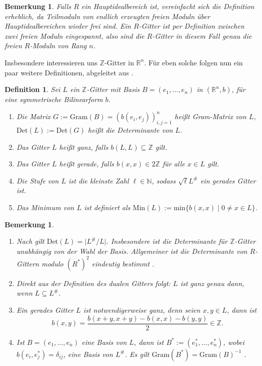 \documentclass[12pt,a4paper,halfparskip,headsepline,bibtotocnumbered]{scrreprt}
\theoremstyle{nummermitklammern}
\newtheorem{definition}[defsatzusw]{Definition}
\newtheorem{bemerkung}[defsatzusw]{Bemerkung}
\theoremstyle{nonumberbreak}
\newcommand{\N}{\mathbb{N}}
\newcommand{\Z}{\mathbb{Z}}
\newcommand{\R}{\mathbb{R}}
\newcommand{\Det}{\text{Det}}
\newcommand{\Min}{\text{Min}}
\begin{document}
\begin{bemerkung}
	Falls $R$ ein Hauptidealbereich ist, vereinfacht sich die Definition erheblich, da Teilmoduln von endlich erzeugten freien Moduln über Hauptidealbereichen wieder frei sind. Ein $R$-Gitter ist per Definition zwischen zwei freien Moduln eingespannt, also sind die $R$-Gitter in diesem Fall genau die freien $R$-Moduln von Rang $n$.
\end{bemerkung}

Insbesondere interessieren uns $\Z$-Gitter in $\R^n$. Für eben solche folgen nun ein paar weitere Definitionen, abgeleitet aus \cite[Def. (1.7), (1.13), (14.7), (26.1)]{kneser}.

\begin{framed}
	\begin{definition}
		Sei $L$ ein $\Z$-Gitter mit Basis $B = (e_1, \dots, e_n)$ in $(\R^n, b)$, für eine symmetrische Bilinearform $b$.
		\begin{enumerate}[label=(\roman*)]
			\item Die Matrix $G := \text{Gram}(B) = \left(b(e_i, e_j)\right)_{i,j=1}^n$ heißt \textit{Gram-Matrix} von $L$, $\Det(L) := \Det(G)$ heißt die \textit{Determinante} von $L$.
			\item Das Gitter $L$ heißt \textit{ganz}, falls $b(L,L) \subseteq \Z$ gilt.
			\item Das Gitter $L$ heißt \textit{gerade}, falls $b(x,x) \in 2\Z$ für alle $x \in L$ gilt.
			\item Die \textit{Stufe} von $L$ ist die kleinste Zahl $\ell \in \N$, sodass $\sqrt{\ell} L^\#$ ein gerades Gitter ist.
			\item Das \textit{Minimum} von $L$ ist definiert als $\Min(L) := \text{min} \lbrace b(x,x) \mid 0 \neq x \in L \rbrace$.
		\end{enumerate}
	\end{definition}
\end{framed}


\begin{bemerkung}\label{bem:dual}
	\begin{enumerate}[label=(\roman*)]
	\item Nach \cite[Satz (14.7)]{kneser} gilt $\Det(L) = \vert L^\# / L \vert$. 
		Insbesondere ist die Determinante für $\Z$-Gitter unabhängig von der Wahl der Basis. Allgemeiner ist die Determinante von $R$-Gittern modulo $\left( R^\ast \right) ^2$ eindeutig bestimmt \cite[(1.13)]{kneser}.
	\item Direkt aus der Definition des dualen Gitters folgt: $L$ ist ganz genau dann, wenn $L \subseteq L^\#$.
	\item Ein gerades Gitter $L$ ist notwendigerweise ganz, denn seien $x,y \in L$, dann ist
		\begin{equation*}
			b(x,y) = \frac{b(x+y,x+y) - b(x,x) - b(y,y)}{2} \in \Z.
		\end{equation*}
	\item Ist $B = (e_1,\dots,e_n)$ eine Basis von $L$, dann ist $B^\ast := (e_1^\ast, \dots, e_n^\ast)$, wobei $b(e_i, e_j^\ast) = \delta_{ij}$, eine Basis von $L^\#$. Es gilt $\text{Gram}(B^\ast) = \text{Gram}(B)^{-1}$ \cite[(1.14)]{kneser}.
	\end{enumerate}
\end{bemerkung}
\end{document}
